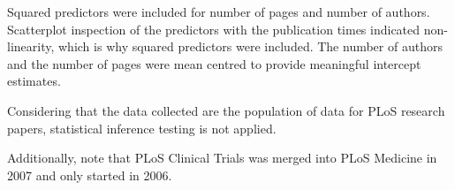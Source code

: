 Squared predictors were included for number of pages and number of authors. Scatterplot inspection of the predictors with the publication times indicated non-linearity, which is why squared predictors were included. The number of authors and the number of pages were mean centred to provide meaningful intercept estimates.

Considering that the data collected are the population of data for PLoS research papers, statistical inference testing is not applied.

Additionally, note that PLoS Clinical Trials was merged into PLoS Medicine in 2007 and only started in 2006.